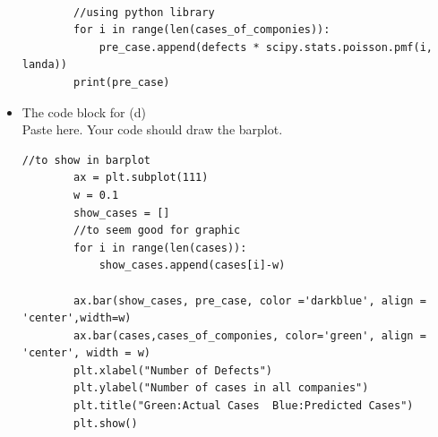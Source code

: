 \documentclass[a4 paper]{article}
\numberwithin{equation}{section}
\newcommand{\0}{\mathbf{0}}
\begin{document}
\begin{itemize}
\begin{lstlisting}[style=CStyle]
            
        //using python library    
        for i in range(len(cases_of_componies)):
            pre_case.append(defects * scipy.stats.poisson.pmf(i, landa))
        print(pre_case)
		\end{lstlisting}
		
		\item The code block for (d)\\
		Paste here. Your code should draw the barplot.
		\begin{lstlisting}[style=CStyle]
		    //to show in barplot
        ax = plt.subplot(111)
        w = 0.1
        show_cases = []
        //to seem good for graphic
        for i in range(len(cases)):
            show_cases.append(cases[i]-w)
    
        ax.bar(show_cases, pre_case, color ='darkblue', align = 'center',width=w)
        ax.bar(cases,cases_of_componies, color='green', align = 'center', width = w)
        plt.xlabel("Number of Defects")
        plt.ylabel("Number of cases in all companies")
        plt.title("Green:Actual Cases  Blue:Predicted Cases")
        plt.show()
		\end{lstlisting}
		
	\end{itemize}
	
	
	
	
\end{document}
